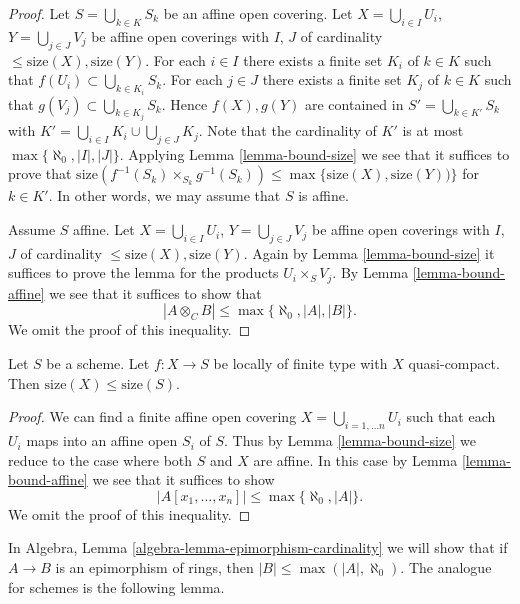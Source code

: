 \begin{proof}
Let $S = \bigcup_{k \in K} S_k$ be an affine open covering.
Let $X = \bigcup_{i \in I} U_i$, $Y = \bigcup_{j \in J} V_j$
be affine open coverings with $I$, $J$ of cardinality
$\leq \text{size}(X), \text{size}(Y)$.
For each $i \in I$ there exists a finite set $K_i$ of $k \in K$
such that $f(U_i) \subset \bigcup_{k \in K_i} S_k$.
For each $j \in J$ there exists a finite set $K_j$ of $k \in K$
such that $g(V_j) \subset \bigcup_{k \in K_j} S_k$.
Hence $f(X), g(Y)$ are contained in
$S' = \bigcup_{k \in K'} S_k$ with
$K' = \bigcup_{i \in I} K_i \cup \bigcup_{j \in J} K_j$.
Note that the cardinality of $K'$
is at most $\max\{\aleph_0, |I|, |J|\}$. Applying
Lemma \ref{lemma-bound-size}
we see that it suffices to prove that
$\text{size}(f^{-1}(S_k) \times_{S_k} g^{-1}(S_k))
\leq \max\{\text{size}(X), \text{size}(Y))\}$ for $k \in K'$.
In other words, we may assume that $S$ is affine.

\medskip\noindent
Assume $S$ affine.
Let $X = \bigcup_{i \in I} U_i$, $Y = \bigcup_{j \in J} V_j$
be affine open coverings with $I$, $J$ of cardinality
$\leq \text{size}(X), \text{size}(Y)$.
Again by
Lemma \ref{lemma-bound-size}
it suffices to prove the lemma for the products
$U_i \times_S V_j$. By
Lemma \ref{lemma-bound-affine}
we see that it suffices to show that
$$
|A \otimes_C B| \leq \max\{\aleph_0, |A|, |B|\}.
$$
We omit the proof of this inequality.
\end{proof}

\begin{lemma}
\label{lemma-bound-finite-type}
Let $S$ be a scheme.
Let $f : X \to S$ be locally of finite type with $X$ quasi-compact.
Then $\text{size}(X) \leq \text{size}(S)$.
\end{lemma}

\begin{proof}
We can find a finite affine open covering $X = \bigcup_{i = 1, \ldots n} U_i$
such that each $U_i$ maps into an affine open $S_i$ of $S$. Thus by
Lemma \ref{lemma-bound-size}
we reduce to the case where both $S$ and $X$ are affine. In this case by
Lemma \ref{lemma-bound-affine}
we see that it suffices to show
$$
|A[x_1, \ldots, x_n]| \leq \max\{\aleph_0, |A|\}.
$$
We omit the proof of this inequality.
\end{proof}

\noindent
In
Algebra, Lemma \ref{algebra-lemma-epimorphism-cardinality}
we will show that if $A \to B$ is an epimorphism of rings, then
$|B| \leq \max(|A|, \aleph_0)$.
The analogue for schemes is the following lemma.


